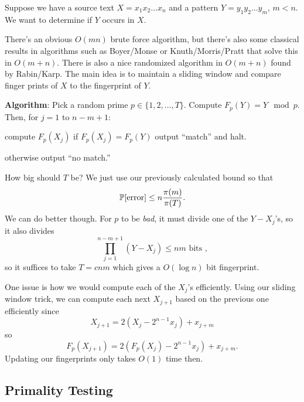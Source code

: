 \documentclass[11 pt]{scrartcl}
\begin{document}
\begin{example}
    Suppose we have a source text $X = x_1x_2\dots x_n$ and a pattern $Y = y_1y_2\dots y_m$, $m < n$. We want to determine if $Y$ occurs in $X$. 

    There's an obvious $O(mn)$ brute force algorithm, but there's also some classical results in algorithms such as Boyer/Monse or Knuth/Morris/Pratt that solve this in $O(m + n)$. There is also a nice randomized algorithm in $O(m+n)$ found by Rabin/Karp. The main idea is to maintain a sliding window and compare finger prints of $X$ to the fingerprint of $Y$. 

    \textbf{Algorithm}: Pick a random prime $p \in \{1, 2, \dots, T\}$. Compute $F_p(Y) = Y \mod p$. Then, for $j = 1$ to $n-m+1$:
    \begin{itemize}
        \ii compute $F_p(X_j)$
        \ii if $F_p(X_j) = F_p(Y)$ output ``match'' and halt.  
    \end{itemize}
    otherwise output ``no match.''

    How big should $T$ be? We just use our previously calculated bound so that 
    \[ \mathbb P[\text{error}] \leq n \dfrac{\pi(m)}{\pi(T)}.\] 
    We can do better though. For $p$ to be \emph{bad}, it must divide one of the $Y-X_j$'s, so it also divides 
    \[ \prod_{j=1}^{n-m+1} (Y-X_j) \leq nm\text{ bits },\] 
    so it suffices to take $T = cnm$ which gives a $O(\log n)$ bit fingerprint. 
\end{example}

One issue is how we would compute each of the $X_j$'s efficiently. Using our sliding window trick, we can compute each next $X_{j+1}$ based on the previous one efficiently since 
\[ X_{j+1} = 2(X_j - 2^{n-1}x_j) + x_{j + m}\] 
so 
\[ F_p(X_{j+1}) = 2(F_p(X_j) - 2^{n-1}x_j) + x_{j+m}.\]
Updating our fingerprints only takes $O(1)$ time then. 

\subsection{Primality Testing}
\end{document}

